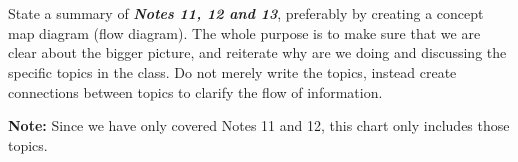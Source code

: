 \documentclass[]{article}
\numberwithin{equation}{section}
\begin{document}












\newpage
\section{}
State a summary of \emph{\textbf{Notes 11, 12 and 13}}, preferably by creating a concept map diagram (flow diagram). 
The whole purpose is to make sure that we are clear about the bigger picture, 
and reiterate why are we doing and discussing the specific topics in the class. 
Do not merely write the topics, instead create connections between topics to clarify the flow of information.

\textbf{Note:} 
Since we have only covered Notes 11 and 12, this chart only includes those topics.
\end{document}
